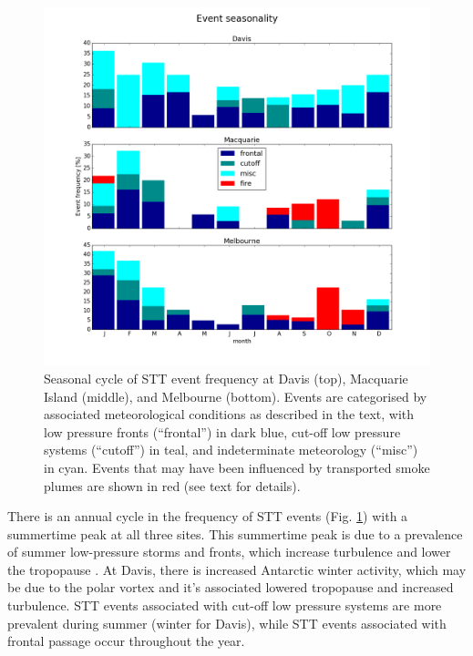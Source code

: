   \begin{figure}[t]
    \includegraphics[width=12cm]{figures/summary_season.png}
    \caption{Seasonal cycle of STT event frequency at Davis (top), Macquarie Island (middle), and Melbourne (bottom).
      Events are categorised by associated meteorological conditions as described in the text, with low pressure fronts (“frontal”) in dark blue, cut-off low pressure systems (“cutoff”) in teal, and indeterminate meteorology (“misc”) in cyan. 
      Events that may have been influenced by transported smoke plumes are shown in red (see text for details).}
    \label{fig:SummarySeasonality}
  \end{figure}
  
  There is an annual cycle in the frequency of STT events  (Fig. \ref{fig:SummarySeasonality}) with a summertime peak at all three sites.
  This summertime peak is due to a prevalence of summer low-pressure storms and fronts, which increase turbulence and lower the tropopause \citep{Reutter2015}.
  At Davis, there is increased Antarctic winter activity, which may be due to the polar vortex and it's associated lowered tropopause and increased turbulence.
  STT events associated with cut-off low pressure systems are more prevalent during summer (winter for Davis), while STT events associated with frontal passage occur throughout the year.

